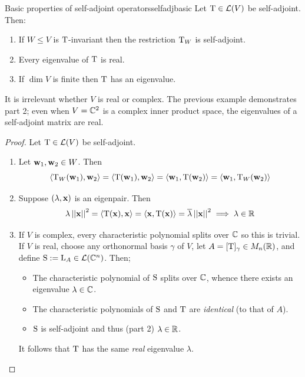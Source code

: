 \pagebreak[3]



\begin{lemm}{Basic properties of self-adjoint operators}{selfadjbasic}
	Let $\mathrm{T}\in\mathcal{L}(V)$ be self-adjoint. Then:
	\begin{enumerate}
	  \item If $W\le V$ is $\mathrm{T}$-invariant then the restriction $\mathrm{T}_{W}$ is self-adjoint.
	  \item Every eigenvalue of $\mathrm{T}$ is real.
	  \item If $\dim V$ is finite then $\mathrm{T}$ has an eigenvalue.
	\end{enumerate}
\end{lemm}

It is irrelevant whether $V$ is real or complex. The previous example demonstrates part 2; even when $V=\mathbb{C}^2$ is a complex inner product space, the eigenvalues of a self-adjoint matrix are real.

\begin{proof}
	Let $\mathrm{T}\in\mathcal{L}(V)$ be self-adjoint.
	\begin{enumerate}
	  \item Let ${\mathbf{w}}_1,{\mathbf{w}}_2\in W$. Then
	  \[
	  	\left\langle \mathrm{T}_{W}({\mathbf{w}}_1),{\mathbf{w}}_2\right\rangle= \left\langle \mathrm{T}({\mathbf{w}}_1),{\mathbf{w}}_2\right\rangle
	  	= \left\langle {\mathbf{w}}_1,\mathrm{T}({\mathbf{w}}_2)\right\rangle =\left\langle {\mathbf{w}}_1,\mathrm{T}_{W}({\mathbf{w}}_2)\right\rangle
	  \]
	  \item Suppose $(\lambda,{\mathbf{x}})$ is an eigenpair. Then
	  \[
	  	\lambda\left| \left| {\mathbf{x}}\right|\right|^2 =\left\langle \mathrm{T}({\mathbf{x}}),{\mathbf{x}}\right\rangle
	  	=\left\langle {\mathbf{x}},\mathrm{T}({\mathbf{x}})\right\rangle =\overline{\lambda}\left| \left| {\mathbf{x}}\right|\right|^2
	  	\implies \lambda\in\mathbb{R}
	  \]
	  \item If $V$ is complex, every characteristic polynomial splits over $\mathbb{C}$ so this is trivial. If $V$ is real, choose any orthonormal basis $\gamma$ of $V$, let $A=[\mathrm{T}]_\gamma\in M_n(\mathbb{R})$, and define $\mathrm{S}:=\mathrm{L}_A\in\mathcal{L}(\mathbb{C}^{n})$. Then;
		\begin{itemize}
		  \item The characteristic polynomial of $\mathrm{S}$ splits over $\mathbb{C}$, whence there exists an eigenvalue $\lambda\in\mathbb{C}$.
	  	\item The characteristic polynomials of $\mathrm{S}$ and $\mathrm{T}$ are \emph{identical} (to that of $A$).
	  	\item $\mathrm{S}$ is self-adjoint and thus (part 2) $\lambda\in\mathbb{R}$.
		\end{itemize}
	  It follows that $\mathrm{T}$ has the same \emph{real} eigenvalue $\lambda$.\qedhere
	\end{enumerate}
\end{proof}


